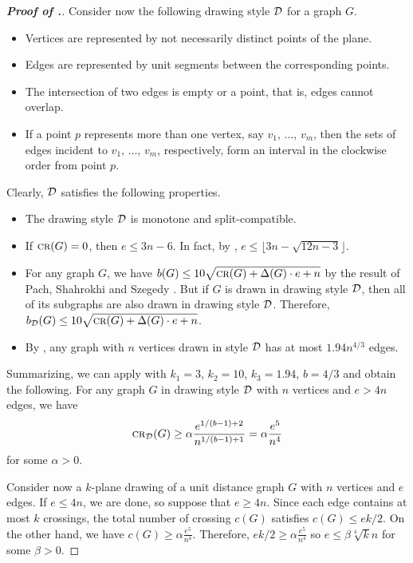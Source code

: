\documentclass[a4paper,10pt]{article}
\def\cro{{\mbox {\sc cr}}}
\begin{document}
\begin{proof}[\bf Proof of .]
Consider now the following drawing style $\cal D$ for a graph $G$.

\begin{itemize}
\item[1.] Vertices are represented by not necessarily distinct points of the plane. 
\item[2.]  Edges are represented by unit segments between the corresponding points.
\item[3.]  The intersection of two  edges is empty or a point, that is, edges cannot overlap.
\item[4.]  If a point $p$ represents more than one vertex, say $v_1, \, \dots, \, v_m$, then 
the sets of edges incident to $v_1, \, \dots, \, v_m$, respectively, form an interval in the clockwise order
from point $p$. 
\end{itemize}

Clearly,  ${\cal D}$ satisfies the following properties.
\begin{itemize}
\item[1.] The drawing style $\cal D$ is monotone and split-compatible. 
\item[2.]  If ${\cro}(G) = 0$, then $e \leq 3n-6$. In fact, by \cite{LS22}, $e\le \lfloor 3n - \sqrt{12n - 3}\rfloor$. 
\item[3.] For any graph $G$, we have  $b(G)\le 10\sqrt{{\cro}(G) + \Delta(G) \cdot e + n}$ by the result of 
Pach, Shahrokhi and Szegedy \cite{PSS94}.
But if $G$ is drawn in drawing style ${\cal D}$, then all of its subgraphs are also drawn in drawing style  ${\cal D}$. Therefore, $b_{\cal D}(G)\le 10\sqrt{{\cro}(G) + \Delta(G) \cdot e + n}$. 
\item[4.]  By \cite{AP22}, any graph with $n$ vertices drawn in  style $\cal D$ has at most $1.94n^{4/3}$ edges.
\end{itemize}

Summarizing, we can apply  with $k_1=3$, $k_2=10$, $k_3=1.94$, $b=4/3$ and obtain the following. For any graph $G$ in drawing style $\cal D$ with $n$ vertices and $e>4n$ edges, we have 
$$\cro_{\cal D}(G) \geq \alpha \frac{e^{1/(b-1)+2}}{n^{1/(b-1)+1}}=\alpha\frac{e^5}{n^4}$$
for some $\alpha >0$.

Consider now a $k$-plane drawing of a unit distance graph $G$ with $n$ vertices and $e$ edges. If $e\le 4n$, we are done, so suppose that $e\ge 4n$. Since each edge contains at most $k$ crossings, the total number of crossing $c(G)$ satisfies $c(G)\le ek/2$. On the other hand, we have $c(G)\ge \alpha\frac{e^5}{n^4}$.
Therefore, $ek/2\ge \alpha\frac{e^5}{n^4}$ so 
$e\le \beta\sqrt[4]{k}n$ for some $\beta>0$.
\end{proof}
\end{document}

